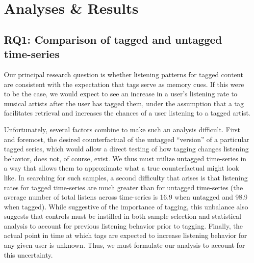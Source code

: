 \section{Analyses \& Results}
\label{sec_analyses}

\subsection{RQ1: Comparison of tagged and untagged time-series}
Our principal research question is whether listening patterns for tagged content are consistent with the expectation that tags serve as memory cues. If this were to be the case, we would expect to see an increase in a user's listening rate to musical artists after the user has tagged them, under the assumption that a tag facilitates retrieval and increases the chances of a user listening to a tagged artist. 

Unfortunately, several factors combine to make such an analysis difficult.  First and foremost, the desired counterfactual of the untagged ``version'' of a particular tagged series, which would allow a direct testing of how tagging changes listening behavior, does not, of course, exist. We thus must utilize untagged time-series in a way that allows them to approximate what a true counterfactual might look like.  In searching for such samples, a second difficulty that arises is that listening rates for tagged time-series are much greater than for untagged time-series (the average number of total listens across time-series is 16.9 when untagged and 98.9 when tagged). While suggestive of the importance of tagging, this unbalance also suggests that controls must be instilled in both sample selection and statistical analysis to account for previous listening behavior prior to tagging. Finally, the actual point in time at which tags are expected to increase listening behavior for any given user is unknown. Thus, we must formulate our analysis to account for this uncertainty.  

